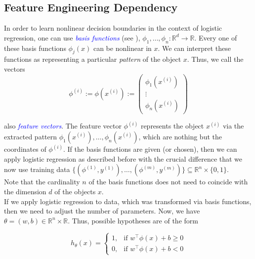 \subsection{Feature Engineering Dependency}
In order to learn nonlinear decision boundaries in the context of logistic regression, one can use \textcolor{blue}{\emph{basis functions}} (see \cite[chapter 4.3.2]{bishop2006pattern}), $\phi_1, \dots, \phi_n : \mathbb{R}^d \rightarrow \mathbb{R}$. Every one of these basis functions $\phi_j(x)$ can be nonlinear in $x$. We can interpret these functions as representing a particular \emph{pattern} of the object $x$. Thus, we call the vectors
\begin{equation}
    \phi^{(i)} := \phi(x^{(i)}) := 
    \begin{pmatrix}
        \phi_1(x^{(i)}) \\
        \vdots \\
        \phi_n(x^{(i)})
    \end{pmatrix}
    \label{eqn:18}
\end{equation}

also \textcolor{blue}{\emph{feature vectors}}. The feature vector $\phi^{(i)}$ represents the object $x^{(i)}$ via the extracted pattern $\phi_1(x^{(i)}), \dots, \phi_n(x^{(i)})$, which are nothing but the coordinates of $\phi^{(i)}$. If the basis functions are given (or chosen), then we can apply logistic regression as described before with the crucial
difference that we now use training data $\{(\phi^{(1)}, y^{(1)}), \dots, (\phi^{(m)}, y^{(m)}) \} \subseteq \mathbb{R}^n \times \{0, 1\}$.\\

Note that the cardinality $n$ of the basis functions does not need to coincide with the dimension $d$ of the objects $x$.\\

If we apply logistic regression to data, which was transformed via basis functions, then we need to adjust the number of parameters. Now, we have $\theta = (w, b) \in \mathbb{R}^n \times \mathbb{R}$. Thus, possible hypotheses are of the form

\begin{equation}
    h_{\theta}(x) =
    \begin{cases} 
        1, & \text{if } w^ \top \phi(x) + b \geq 0 \\
        0, & \text{if } w^ \top \phi(x) + b < 0
    \end{cases}
    \label{eqn:19}
\end{equation}

